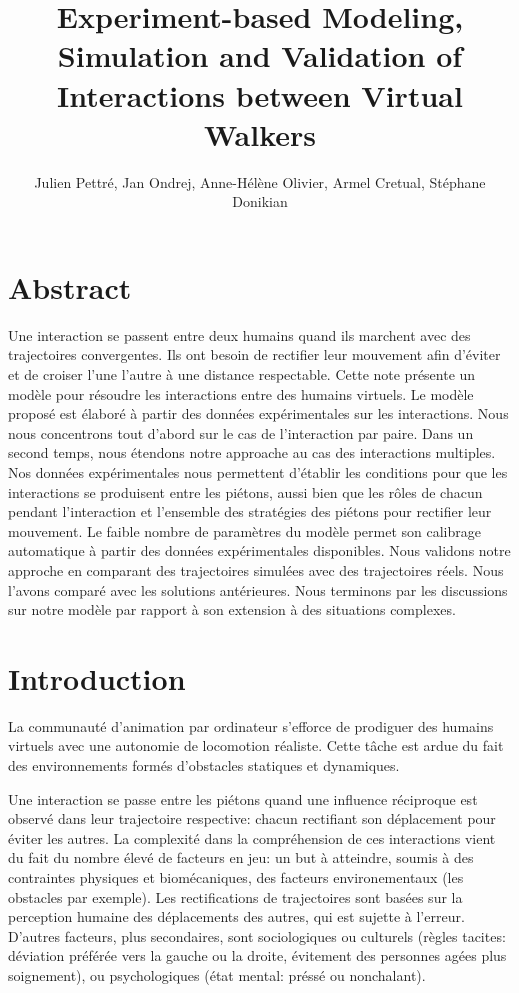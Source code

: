 \documentclass[11pt]{article}
\title{Experiment-based Modeling, Simulation and Validation of Interactions between Virtual Walkers}
\author{Julien Pettré, Jan Ondrej, Anne-Hélène Olivier, Armel Cretual, Stéphane Donikian}
\date{
	\begin{center}
		Bunraku team, IRISA / INRIA-Rennes, France\\
		M2S, UEB, Université de Rennes 2, France
	\end{center}
}
\begin{document}
\maketitle

\section*{Abstract}

Une interaction se passent entre deux humains quand ils marchent avec des trajectoires convergentes. Ils ont besoin de rectifier leur mouvement afin d'éviter et de croiser l'une l'autre à une distance respectable. Cette note présente un modèle pour résoudre les interactions entre des humains virtuels. Le modèle proposé est élaboré à partir des données expérimentales sur les interactions. Nous nous concentrons tout d'abord sur le cas de l'interaction par paire. Dans un second temps, nous étendons notre approache au cas des interactions multiples. Nos données expérimentales nous permettent d'établir les conditions pour que les interactions se produisent entre les piétons, aussi bien que les rôles de chacun pendant l'interaction et l'ensemble des stratégies des piétons pour rectifier leur mouvement. Le faible nombre de paramètres du modèle permet son calibrage automatique à partir des données expérimentales disponibles. Nous validons notre approche en comparant des trajectoires simulées avec des trajectoires réels. Nous l'avons comparé avec les solutions antérieures. Nous terminons par les discussions sur notre modèle par rapport à son extension à des situations complexes.

\section{Introduction}

La communauté d'animation par ordinateur s'efforce de prodiguer des humains virtuels avec une autonomie de locomotion réaliste. Cette tâche est ardue du fait des environnements formés d'obstacles statiques et dynamiques.

Une interaction se passe entre les piétons quand une influence réciproque est observé dans leur trajectoire respective: chacun rectifiant son déplacement pour éviter les autres. La complexité dans la compréhension de ces interactions vient du fait du nombre élevé de facteurs en jeu: un but à atteindre, soumis à des contraintes physiques et biomécaniques, des facteurs environementaux (les obstacles par exemple). Les rectifications de trajectoires sont basées sur la perception humaine des déplacements des autres, qui est sujette à l'erreur. D'autres facteurs, plus secondaires, sont sociologiques ou culturels (règles tacites: déviation préférée vers la gauche ou la droite, évitement des personnes agées plus soignement), ou psychologiques (état mental: préssé ou nonchalant).
\end{document}
